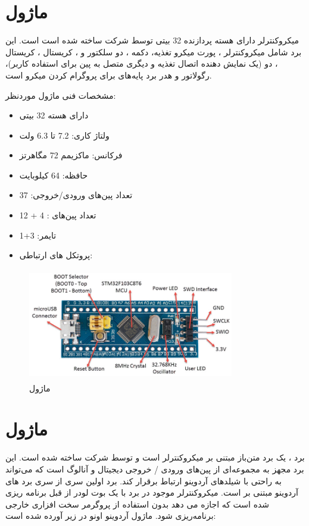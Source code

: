 \section{ماژول }
میکروکنترلر  دارای هسته پردازنده 32 بیتی توسط شرکت  ساخته شده است است. این برد شامل میکروکنترلر ، پورت میکرو  تغذیه، دکمه ، دو سلکتور  و ، کریستال ، کریستال ، دو  (یک  نمایش دهنده اتصال تغذیه و دیگری متصل به پین  برای استفاده کاربر)، رگولاتور  و هدر برد پایه‌های  برای پروگرام کردن میکرو است.

مشخصات فنی ماژول موردنظر:
\begin{itemize}
	\item دارای هسته 32 بیتی 
	\item ولتاژ کاری: 7.2 تا 6.3 ولت
	\item فرکانس: ماکزیمم 72 مگاهرتز
	\item حافظه: 64 کیلوبایت
	\item تعداد پین‌های ورودی/خروجی: 37
	\item تعداد پین‌های : 4 + 12
	\item تایمر: 3+1
	\item پروتکل های ارتباطی: 
\end{itemize}

    \begin{figure}[!h]
	\centering
	\includegraphics[height=4.9cm,width=9cm]{./Images/CH3/STM32.jpg}
	\caption{ماژول }
	\label{STM32}
	\end{figure} 

\section{ماژول }

برد  ، یک برد متن‌باز مبتنی بر میکروکنترلر    است و توسط شرکت  ساخته شده است. این برد مجهز به مجموعه‌ای از پین‌های ورودی / خروجی دیجیتال و آنالوگ است که می‌تواند به راحتی با شیلدهای آردوینو ارتباط برقرار کند. برد  اولین سری از سری برد های آردوینو مبتنی بر  است. میکروکنترلر  موجود در برد با یک بوت لودر از قبل برنامه ریزی شده است که اجازه می دهد بدون استفاده از پروگرمر سخت افزاری خارجی برنامه‌ریزی شود. ماژول آردوینو اونو در زیر آورده شده است:

